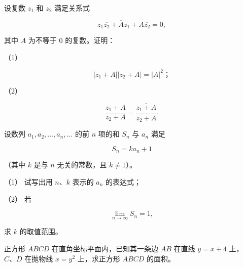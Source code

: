 \begin{question}
设复数 $z_1$ 和 $z_2$ 满足关系式

\nopagebreak[4]
\[
z_1\overline{z_2}+\overline A z_1+A\overline{z_2}=0,
\]

其中 $A$ 为不等于 0 的复数。证明：

（1）　

\nopagebreak[4]
\[
|z_1+A||z_2+A|=|A|^2\text{；}
\]

（2）　

\nopagebreak[4]
\[
\frac{z_1+A}{z_2+A}
=\frac{\overline{z_1+A}}{\overline{z_2+A}}.
\]


\end{question}
\begin{question}
设数列 $a_1,a_2,\ldots,a_n,\ldots$ 的前 $n$ 项的和 $S_n$ 与 $a_n$ 满足

\nopagebreak[4]
\[
S_n=ka_n+1
\]

（其中 $k$ 是与 $n$ 无关的常数，且 $k\ne1$）。

（1） 试写出用 $n\text{、}k$ 表示的 $a_n$ 的表达式；

（2） 若

\nopagebreak[4]
\[
\lim_{n\to\infty}S_n=1,
\]

求 $k$ 的取值范围。

\end{question}
\begin{question}
正方形 $ABCD$ 在直角坐标平面内，已知其一条边 $AB$ 在直线 $y=x+4$ 上，$C\text{、}D$ 在抛物线 $x=y^2$ 上，求正方形 $ABCD$ 的面积。

\end{question}